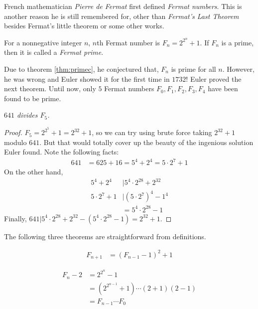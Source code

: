 \documentclass{subfile}
\begin{document}
	French mathematician \textit{Pierre de Fermat} first defined \textit{Fermat numbers}. This is another reason he is still remembered for, other than \textit{Fermat's Last Theorem} besides Fermat's little theorem or some other works.
	
	\begin{definition}
		For a nonnegative integer $n$, $n$th Fermat number is $F_n=2^{2^n}+1$. If $F_n$ is a prime, then it is called a \textit{Fermat prime}.
	\end{definition}
	Due to theorem \eqref{thm:primec}, he conjectured that, $F_n$ is prime for all $n$. However, he was wrong and Euler showed it for the first time in $1732$! Euler proved the next theorem. Until now, only $5$ Fermat numbers $F_0,F_1,F_2,F_3,F_4$ have been found to be prime.
		\begin{theorem}[Euler]\slshape
			$641$ divides $F_5$.
		\end{theorem}
		
		\begin{proof}
			$F_5=2^{2^5}+1=2^{32}+1$, so we can try using brute force taking $2^{32}+1$ modulo $641$. But that would totally cover up the beauty of the ingenious solution Euler found. Note the following facts:
				\begin{align*}
					641 & = 625+16=5^4+2^4 = 5\cdot2^7+1
				\end{align*}
			On the other hand, 
				\begin{align*}
					5^4+2^4 & |5^4\cdot2^{28}+2^{32}\\
					5\cdot2^7+1 & |\left(5\cdot2^7\right)^4-1^4\\
								& = 5^4\cdot2^{28}-1
				\end{align*}
			Finally, $641 |5^4\cdot2^{28}+2^{32}-(5^4\cdot2^{28}-1)=2^{32}+1$.
					
				
		\end{proof}
	The following three theorems are straightforward from definitions.
		\begin{theorem}\slshape
			\begin{align*}
				F_{n+1} & = (F_{n-1}-1)^2+1
			\end{align*}
		\end{theorem}
		
		\begin{theorem}\slshape
			\begin{align*}
				F_n-2 & = 2^{2^n}-1\\
					  & = (2^{2^{n-1}}+1)\cdots(2+1)(2-1)\\
					  & = F_{n-1}\cdots F_0
			\end{align*}
		\end{theorem}
		
\end{document}
